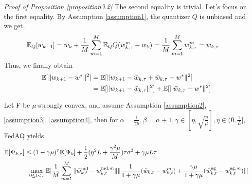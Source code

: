 \emph{Proof of Proposition \ref{proposition3.2}} \textrm{ } The second equality is trivial. Let's focus on the first equality. By Assumption \ref{assumption1}, the quantizer $Q$ is unbiased and we get,
\begin{align*}
    \mathbb{E}_Q[w_{k+1}] &= w_k + \frac{1}{M}\sum_{m=1}^M \mathbb{E}_Q Q(w_{k, \tau}^m - w_k) = \frac{1}{M} \sum_{m=1}^M w_{k, \tau}^m = \Bar{w}_{k, \tau}
\end{align*}
Thus, we finally obtain
\begin{align*}
    \mathbb{E}[\|w_{k+1} - w^*\|^2] &= \mathbb{E}[\|w_{k+1} - \Bar{w}_{k, \tau} + \Bar{w}_{k, \tau} - w^*\|^2] \\
    &= \mathbb{E}[\|w_{k+1} - \Bar{w}_{k, \tau}\|^2] + \mathbb{E}[\|\Bar{w}_{k, \tau} - w^*\|^2]
\end{align*}

\begin{proposition} \label{proposition3.3}
Let F be $\mu$-strongly convex, and assume Assumption \ref{assumption2}, \ref{assumption3}, \ref{assumption4}, then for $\alpha=\frac{1}{\gamma\mu}, \beta=\alpha+1, \gamma \in [\eta, \sqrt{\frac{\eta}{\mu}}], \eta \in (0, \frac{1}{L}]$, FedAQ yields
\begin{align*}
    \mathbb{E}[\Psi_{k, \tau}] &\leq (1-\gamma\mu)^\tau \mathbb{E}[\Psi_k] + \frac{1}{2}(\eta^2 L + \frac{\gamma^2\mu}{M})\tau\sigma^2 + \gamma\mu L \tau \\
    &\cdot \max_{0\leq t <\tau} \mathbb{E}[\frac{1}{M} \sum_{m=1}^M \|\Bar{w}_{k, t}^{\textrm{md}} - w_{k, t}^{\textrm{md}, m}\|\|\frac{1}{1+\gamma\mu}(\Bar{w}_{k, t} - w_{k, t}^m) + \frac{\gamma\mu}{1+\gamma\mu}(\Bar{w}_{k, t}^{\textrm{ag}} - w_{k, t}^{\textrm{ag}, m})\|]
\end{align*}
\end{proposition}

